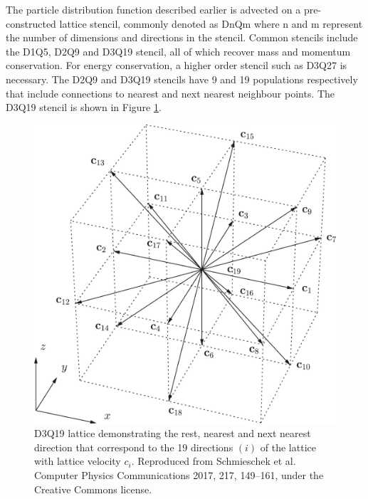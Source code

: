 The particle distribution function described earlier is advected on a pre-constructed lattice stencil, commonly denoted as DnQm where n and m represent the 
number of dimensions and directions in the stencil. \cite{succi_lattice_2018, schmieschek_lb3d_2017}
Common stencils include the D1Q5, D2Q9 and D3Q19 stencil, all of which recover mass and momentum conservation. 
For energy conservation, a higher order stencil such as D3Q27 is necessary. The D2Q9 and D3Q19 stencils have 9 and 19 populations respectively that include 
connections to nearest and next nearest neighbour points. The D3Q19 stencil is shown in Figure \ref{fig:d3q19_lattice}.

\begin{figure}[h]
    \centering
    \includegraphics[scale = 1]{figures/methods/d3q19_lattice.jpg}
    \caption{D3Q19 lattice demonstrating the rest, nearest and next nearest direction that correspond to the 19 
    directions $(i)$ of the lattice with lattice velocity $c_{i}$. \cite{schmieschek_lb3d_2017} Reproduced from 
    Schmieschek et al. Computer Physics Communications 2017, 217, 149--161, under the Creative Commons license.}
    \label{fig:d3q19_lattice}
\end{figure}

